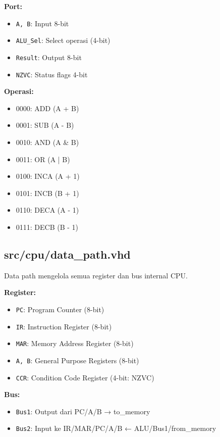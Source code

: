\documentclass[12pt,a4paper]{report}
\begin{document}
\textbf{Port:}
\begin{itemize}
  \item \texttt{A, B}: Input 8-bit
  \item \texttt{ALU\_Sel}: Select operasi (4-bit)
  \item \texttt{Result}: Output 8-bit
  \item \texttt{NZVC}: Status flags 4-bit
\end{itemize}

\textbf{Operasi:}
\begin{itemize}
  \item 0000: ADD (A + B)
  \item 0001: SUB (A - B)
  \item 0010: AND (A \& B)
  \item 0011: OR (A | B)
  \item 0100: INCA (A + 1)
  \item 0101: INCB (B + 1)
  \item 0110: DECA (A - 1)
  \item 0111: DECB (B - 1)
\end{itemize}

\subsection{src/cpu/data\_path.vhd}

Data path mengelola semua register dan bus internal CPU.

\textbf{Register:}
\begin{itemize}
  \item \texttt{PC}: Program Counter (8-bit)
  \item \texttt{IR}: Instruction Register (8-bit)
  \item \texttt{MAR}: Memory Address Register (8-bit)
  \item \texttt{A, B}: General Purpose Registers (8-bit)
  \item \texttt{CCR}: Condition Code Register (4-bit: NZVC)
\end{itemize}

\textbf{Bus:}
\begin{itemize}
  \item \texttt{Bus1}: Output dari PC/A/B → to\_memory
  \item \texttt{Bus2}: Input ke IR/MAR/PC/A/B ← ALU/Bus1/from\_memory
\end{itemize}
\end{document}
